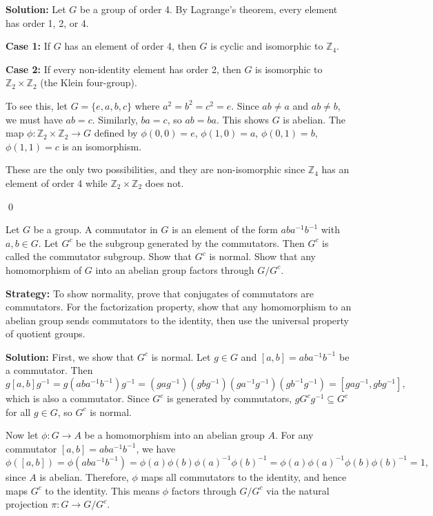 \noindent\textbf{Solution:} Let $G$ be a group of order 4. By Lagrange's theorem, every element has order 1, 2, or 4.

\textbf{Case 1:} If $G$ has an element of order 4, then $G$ is cyclic and isomorphic to $\mathbb{Z}_4$.

\textbf{Case 2:} If every non-identity element has order 2, then $G$ is isomorphic to $\mathbb{Z}_2 \times \mathbb{Z}_2$ (the Klein four-group).

To see this, let $G = \{e, a, b, c\}$ where $a^2 = b^2 = c^2 = e$. Since $ab \neq a$ and $ab \neq b$, we must have $ab = c$. Similarly, $ba = c$, so $ab = ba$. This shows $G$ is abelian. The map $\phi: \mathbb{Z}_2 \times \mathbb{Z}_2 \to G$ defined by $\phi(0,0) = e$, $\phi(1,0) = a$, $\phi(0,1) = b$, $\phi(1,1) = c$ is an isomorphism.

These are the only two possibilities, and they are non-isomorphic since $\mathbb{Z}_4$ has an element of order 4 while $\mathbb{Z}_2 \times \mathbb{Z}_2$ does not.


\qed
\begin{problembox}
Let $G$ be a group. A commutator in $G$ is an element of the form $aba^{-1}b^{-1}$ with $a, b \in G$. Let $G^c$ be the subgroup generated by the commutators. Then $G^c$ is called the commutator subgroup. Show that $G^c$ is normal. Show that any homomorphism of $G$ into an abelian group factors through $G/G^c$.
\end{problembox}

\noindent\textbf{Strategy:} To show normality, prove that conjugates of commutators are commutators. For the factorization property, show that any homomorphism to an abelian group sends commutators to the identity, then use the universal property of quotient groups.

\noindent\textbf{Solution:} First, we show that $G^c$ is normal. Let $g \in G$ and $[a,b] = aba^{-1}b^{-1}$ be a commutator. Then
\[g[a,b]g^{-1} = g(aba^{-1}b^{-1})g^{-1} = (gag^{-1})(gbg^{-1})(ga^{-1}g^{-1})(gb^{-1}g^{-1}) = [gag^{-1}, gbg^{-1}],\]
which is also a commutator. Since $G^c$ is generated by commutators, $gG^cg^{-1} \subseteq G^c$ for all $g \in G$, so $G^c$ is normal.

Now let $\phi: G \to A$ be a homomorphism into an abelian group $A$. For any commutator $[a,b] = aba^{-1}b^{-1}$, we have
\[\phi([a,b]) = \phi(aba^{-1}b^{-1}) = \phi(a)\phi(b)\phi(a)^{-1}\phi(b)^{-1} = \phi(a)\phi(a)^{-1}\phi(b)\phi(b)^{-1} = 1,\]
since $A$ is abelian. Therefore, $\phi$ maps all commutators to the identity, and hence maps $G^c$ to the identity. This means $\phi$ factors through $G/G^c$ via the natural projection $\pi: G \to G/G^c$.


